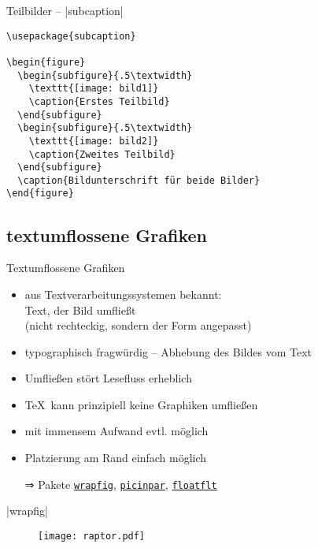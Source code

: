 \documentclass{beamer}
\newcommand{\pkg}[1]{\href{http://ctan.org/pkg/#1}{\alert{\texttt{#1}}}}
\begin{document}
\begin{frame}[fragile]{Teilbilder – |subcaption|}
\begin{lstlisting}
\usepackage{subcaption}

\begin{figure}
  \begin{subfigure}{.5\textwidth}
    \texttt{[image: bild1]}
    \caption{Erstes Teilbild}
  \end{subfigure}
  \begin{subfigure}{.5\textwidth}
    \texttt{[image: bild2]}
    \caption{Zweites Teilbild}
  \end{subfigure}
  \caption{Bildunterschrift für beide Bilder}
\end{figure}
\end{lstlisting}

\end{frame}


\subsection{textumflossene Grafiken}
\begin{frame}[fragile]{Textumflossene Grafiken}
	\begin{itemize}
		\item aus Textverarbeitungssystemen bekannt:\\%
		Text, der Bild umfließt\\(nicht rechteckig, sondern der Form angepasst)
		\item typographisch fragwürdig – Abhebung des Bildes vom Text
		\item Umfließen stört Lesefluss erheblich
		\item \TeX\ kann prinzipiell keine Graphiken umfließen
		\item mit immensem Aufwand evtl. möglich
		\item Platzierung am Rand einfach möglich
		\item[⇒] Pakete \pkg{wrapfig}, \pkg{picinpar}, \pkg{floatflt}
	\end{itemize}
\end{frame}

\begin{frame}[fragile]{|wrapfig|}
\begin{LTXexample}[preset=\fontsize{4}{5}\selectfont,pos=b]
\blindtext
\begin{wrapfigure}{r}[0.4\width]{0pt}
  \texttt{[image: raptor.pdf]}
\end{wrapfigure}
\blindtext[3]
\end{LTXexample}
\end{frame}
\end{document}
